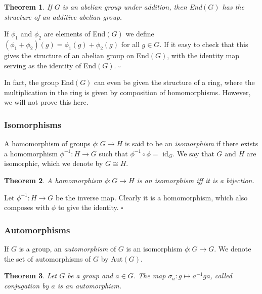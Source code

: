 \documentclass[10pt]{article}
\newtheorem{theorem}{Theorem}[section]
\newenvironment{proof}[1][Proof]{\begin{trivlist}
\item[\hskip \labelsep {\itshape #1}]}{\end{trivlist}}
\newenvironment{definition}[1][Definition]{\begin{trivlist}
\item[\hskip \labelsep {\bfseries #1}]}{\end{trivlist}}
\begin{document}
\begin{theorem}
If $G$ is an abelian group under addition, then End$(G)$ has the structure of an additive abelian group.
\end{theorem}

\begin{proof}
If $\phi_1$ and $\phi_2$ are elements of End$(G)$ we define $(\phi_1 + \phi_2)(g) = \phi_1(g) + \phi_2(g)$ for all $g \in G$. If it easy to check that this gives the structure of an abelian group on End$(G)$, with the identity map serving as the identity of End$(G)$. $\square$
\end{proof}

In fact, the group End$(G)$ can even be given the structure of a ring, where the multiplication in the ring is given by composition of homomorphisms. However, we will not prove this here.

\subsubsection{Isomorphisms}

\begin{definition}
A homomorphism of groups $\phi : G \to H$ is said to be an \emph{isomorphism} if there exists a homomorphism $\phi^{-1} : H \to G$ such that $\phi^{-1}\circ \phi =$ id$_G$. We say that $G$ and $H$ are isomorphic, which we denote by $G \cong H$.
\end{definition}

\begin{theorem}
A homomorphism $\phi : G \to H$ is an isomorphism iff it is a bijection.
\end{theorem}

\begin{proof}
Let $\phi^{-1} : H \to G$ be the inverse map. Clearly it is a homomorphism, which also composes with $\phi$ to give the identity. $\square$
\end{proof}

\subsubsection{Automorphisms}

\begin{definition}
If $G$ is a group, an \emph{automorphism} of $G$ is an isomorphism $\phi : G \to G$. We denote the set of automorphisms of $G$ by Aut$(G)$.
\end{definition}

\begin{theorem}
Let $G$ be a group and $a \in G$. The map $\sigma_a : g \mapsto a^{-1}ga$, called \emph{conjugation} by $a$ is an automorphism.
\end{theorem}
\end{document}
